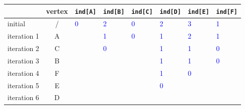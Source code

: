 \begin{table}[htbp]
    \begin{center}
        \begin{tabular}{|l|c|l|l|l|l|l|l|}
            \hline
            & vertex & \texttt{ind[A]}    & \texttt{ind[B]}    & \texttt{ind[C]}    & \texttt{ind[D]}    & \texttt{ind[E]} & \texttt{ind[F]}\\ \hline
            initial     &  /      & \textcolor{blue}{0} & \textcolor{blue}{2} & \textcolor{blue}{0} & \textcolor{blue}{2} & \textcolor{blue}{3} & \textcolor{blue}{1}   \\ \hline
            iteration 1 &   A     & \textcolor{blue}{} & \textcolor{blue}{1} & \textcolor{blue}{0} & \textcolor{blue}{1} & \textcolor{blue}{2} & \textcolor{blue}{1}   \\ \hline
            iteration 2 &   C     & \textcolor{blue}{} & \textcolor{blue}{0} & \textcolor{blue}{} & \textcolor{blue}{1} & \textcolor{blue}{1} & \textcolor{blue}{0}   \\ \hline
            iteration 3 &   B     & \textcolor{blue}{} & \textcolor{blue}{} & \textcolor{blue}{} & \textcolor{blue}{1} & \textcolor{blue}{1} & \textcolor{blue}{0}   \\ \hline
            iteration 4 &   F     & \textcolor{blue}{} & \textcolor{blue}{} & \textcolor{blue}{} & \textcolor{blue}{1} & \textcolor{blue}{0} & \textcolor{blue}{}   \\ \hline
            iteration 5 &   E     & \textcolor{blue}{} & \textcolor{blue}{} & \textcolor{blue}{} & \textcolor{blue}{0} & \textcolor{blue}{} & \textcolor{blue}{}   \\ \hline
            iteration 6 &   D     & \textcolor{blue}{} & \textcolor{blue}{} & \textcolor{blue}{} & \textcolor{blue}{} & \textcolor{blue}{} & \textcolor{blue}{}   \\ \hline
        \end{tabular}
    \end{center}\label{tab:Topological_Sort_Answer}
\end{table}
\vspace{0.5cm}



